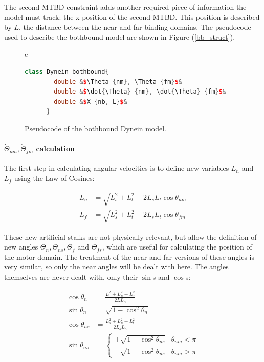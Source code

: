 \documentclass[10pt]{article} %
\begin{document}
The second MTBD constraint adds another required piece of information the model must track: the x position of the second MTBD. This position is described by $L$, the distance between the near and far binding domains. The pseudocode used to describe the bothbound model are shown in Figure (\ref{bb_struct}).\\

\begin{figure}[h]
  \centering
  \begin{tabular}{c}
    \begin{lstlisting}[language=C++]
      class Dynein_bothbound{
        double &$\Theta_{nm}, \Theta_{fm}$&
        double &$\dot{\Theta}_{nm}, \dot{\Theta}_{fm}$&
        double &$X_{nb, L}$&
      }
    \end{lstlisting}
  \end{tabular}
  \caption{Pseudocode of the bothbound Dynein model.}
  \label{ob_struct}
\end{figure}

\paragraph{$\dot{\Theta}_{nm}, \dot{\Theta}_{fm}$ calculation}

The first step in calculating angular velocities is to define new variables $L_n$ and $L_f$ using the Law of Cosines:

\begin{align}
  L_n &= \sqrt{L_s^2 + L_t^2 - 2L_sL_t\cos{\theta_{nm}}} \\
  L_f &= \sqrt{L_s^2 + L_t^2 - 2L_sL_t\cos{\theta_{fm}}}
\end{align}

These new artificial stalks are not physically relevant, but allow the definition of new angles $\Theta_n, \Theta_{ns}, \Theta_{f}$ and $\Theta_{fs}$, which are useful for calculating the position of the motor domain. The treatment of the near and far versions of these angles is very similar, so only the near angles will be dealt with here. The angles themselves are never dealt with, only their $\sin$s and $\cos$s:

\begin{align}
  \cos\theta_n &= \frac{L^2 + L_n^2 - L_f^2}{2L L_n} \\
  \sin\theta_{n} &= \sqrt{1 - \cos^2\theta_{n}} \\
  \cos\theta_{ns} &= \frac{L_s^2 + L_n^2 - L_t^2}{2L_s L_n} \\
  \sin\theta_{ns} &=
  \begin{cases}
    +\sqrt{1 - \cos^2\theta_{ns}} & \theta_{nm} < \pi \\
    -\sqrt{1 - \cos^2\theta_{ns}} & \theta_{nm} > \pi
  \end{cases}
\end{align}
\end{document}
